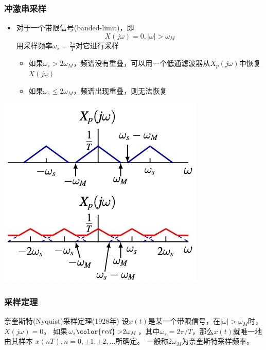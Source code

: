 \documentclass[CJKutf8,dvipsnames,table]{beamer}
\begin{document}
\begin{CJK*}{UTF8}{song}
  \begin{frame}
    \frametitle{冲激串采样}
    \begin{itemize}
    \item 对于一个带限信号(banded-limit)，即
    \[
    	X(j\omega) = 0, |\omega|>\omega_M
    \]
    用采样频率$\omega_s=\frac{2\pi}{T}$对它进行采样
    	\begin{itemize}
		\item 如果$\omega_s > 2\omega_M$，频谱没有重叠，可以用一个低通滤波器从$X_p(j\omega)$中恢复$X(j\omega)$
		\item 如果$\omega_s \leq 2\omega_M$，频谱出现重叠，则无法恢复
		\end{itemize}
    \end{itemize}
    \begin{center}
      \includegraphics[scale=.4]{overlap}
    \end{center}
  \end{frame}   
     
  \begin{frame}
    \frametitle{采样定理}

	\begin{block}{奈奎斯特(Nyquist)采样定理(1928年)}
		设$x(t)$是某一个带限信号，在$|\omega|>\omega_M$时，$X(j\omega)=0$。
		如果$\omega_s{\color{red}>}2\omega_M$，其中$\omega_s=2\pi/T$，那么$x(t)$就唯一地由其样本
		$x(nT), n=0, \pm1, \pm2, \hdots$所确定。
		一般称$2\omega_M$为奈奎斯特采样频率。
	\end{block}


\end{frame}
\end{CJK*}
\end{document}
